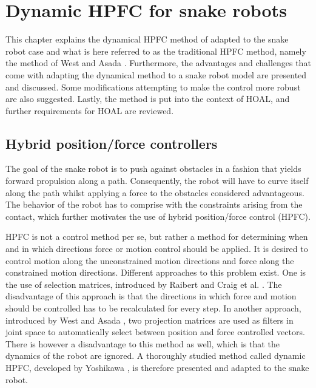 \chapter{Dynamic HPFC for snake robots}\label{ch:hpfc}

This chapter explains the dynamical HPFC method of \cite{yoshikawa1987dynamic} adapted to the snake robot case and what is here referred to as the traditional HPFC method, namely the method of West and Asada \cite{west1985method}. Furthermore, the advantages and challenges that come with adapting the dynamical method to a snake robot model are presented and discussed. Some modifications attempting to make the control more robust are also suggested. Lastly, the method is put into the context of HOAL, and further requirements for HOAL are reviewed.


\section{Hybrid position/force controllers}

The goal of the snake robot is to push against obstacles in a fashion that yields forward propulsion along a path. Consequently, the robot will have to curve itself along the path whilst applying a force to the obstacles considered advantageous. The behavior of the robot has to comprise with the constraints arising from the contact, which further motivates the use of hybrid position/force control (HPFC).

HPFC is not a control method per se, but rather a method for determining when and in which directions force or motion control should be applied. It is desired to control motion along the unconstrained motion directions and force along the constrained motion directions. Different approaches to this problem exist. One is the use of selection matrices, introduced by Raibert and Craig et al. \cite{raibert1981hybrid}. The disadvantage of this approach is that the directions in which force and motion should be controlled has to be recalculated for every step. In another approach, introduced by West and Asada \cite{west1985method}, two projection matrices are used as filters in joint space to automatically select between position and force controlled vectors. There is however a disadvantage to this method as well, which is that the dynamics of the robot are ignored. A thoroughly studied method called dynamic HPFC, developed by Yoshikawa \cite{yoshikawa1987dynamic}, is therefore presented and adapted to the snake robot.

